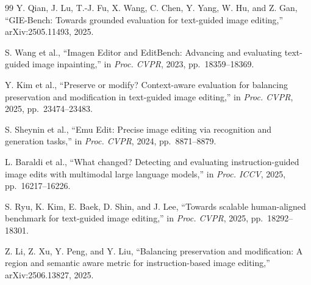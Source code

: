 \begin{thebibliography}{99}
Y. Qian, J. Lu, T.-J. Fu, X. Wang, C. Chen, Y. Yang, W. Hu, and Z. Gan,
``GIE-Bench: Towards grounded evaluation for text-guided image editing,'' arXiv:2505.11493, 2025.

S. Wang et al.,
``Imagen Editor and EditBench: Advancing and evaluating text-guided image inpainting,'' in \emph{Proc. CVPR}, 2023, pp.~18359--18369.

Y. Kim et al.,
``Preserve or modify? Context-aware evaluation for balancing preservation and modification in text-guided image editing,'' in \emph{Proc. CVPR}, 2025, pp.~23474--23483.

S. Sheynin et al.,
``Emu Edit: Precise image editing via recognition and generation tasks,'' in \emph{Proc. CVPR}, 2024, pp.~8871--8879.

L. Baraldi et al., ``What changed? Detecting and evaluating instruction-guided image edits with multimodal large language models,'' in \emph{Proc. ICCV}, 2025, pp.~16217--16226.

S. Ryu, K. Kim, E. Baek, D. Shin, and J. Lee,
``Towards scalable human-aligned benchmark for text-guided image editing,'' in \emph{Proc. CVPR}, 2025, pp.~18292--18301.

Z. Li, Z. Xu, Y. Peng, and Y. Liu, ``Balancing preservation and modification: A region and semantic aware metric for instruction-based image editing,'' arXiv:2506.13827, 2025.

\end{thebibliography}
